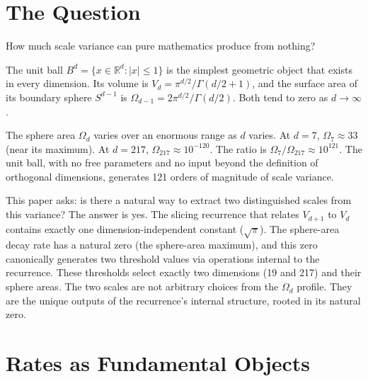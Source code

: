 \documentclass[11pt,a4paper]{article}
\begin{document}
\begin{abstract}
Section~4 proves that each step of the slicing recurrence sends one direction's
effective radius to $R_{\mathrm{eff}} = 1/\sqrt{d+3}$, derived exactly from the Beta function. The
boundary-to-volume ratio $\Omega_{d-1}/V_d = d$ proves that sphere areas---not volumes---are
the cascade's primary objects. Corollary~4.12 establishes that sphere area is the only
independent cascade quantity at each level: every other cascade object is derived
from sphere areas, so any physical identification mapping cascade content to energy
must do so with a universal constant, with no level-type dependence available.
\end{abstract}

\tableofcontents
\newpage

\section{The Question}

How much scale variance can pure mathematics produce from nothing?

The unit ball $B^d = \{x \in \mathbb{R}^d : |x| \leq 1\}$ is the simplest geometric object that exists in
every dimension. Its volume is $V_d = \pi^{d/2}/\Gamma(d/2+1)$, and the surface area of its boundary
sphere $S^{d-1}$ is $\Omega_{d-1} = 2\pi^{d/2}/\Gamma(d/2)$. Both tend to zero as $d\to\infty$.

The sphere area $\Omega_d$ varies over an enormous range as $d$ varies. At $d=7$, $\Omega_7 \approx 33$
(near its maximum). At $d=217$, $\Omega_{217} \approx 10^{-120}$. The ratio is $\Omega_7/\Omega_{217} \approx 10^{121}$. The unit
ball, with no free parameters and no input beyond the definition of orthogonal dimensions,
generates 121 orders of magnitude of scale variance.

This paper asks: is there a natural way to extract two distinguished scales from this
variance? The answer is yes. The slicing recurrence that relates $V_{d+1}$ to $V_d$ contains exactly
one dimension-independent constant ($\sqrt{\pi}$). The sphere-area decay rate has a natural
zero (the sphere-area maximum), and this zero canonically generates two threshold values via
operations internal to the recurrence. These thresholds select exactly two dimensions (19
and 217) and their sphere areas. The two scales are not arbitrary choices from the $\Omega_d$
profile. They are the unique outputs of the recurrence's internal structure, rooted in its
natural zero.

\section{Rates as Fundamental Objects}
\end{document}
